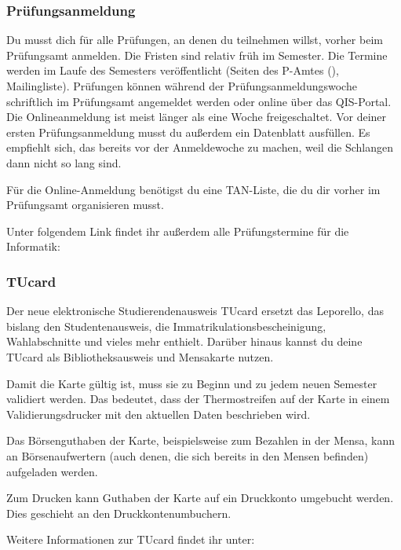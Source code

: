 \begin{multicols}{2}
\subsubsection{Prüfungsanmeldung}
	\label{todoanmeldung}

	Du musst dich für alle Prüfungen, an denen du teilnehmen willst, vorher beim Prüfungsamt anmelden. Die Fristen sind relativ früh im Semester. Die Termine werden im Laufe des Semesters veröffentlicht (Seiten des P-Amtes (), Mailingliste). Prüfungen können während der Prüfungsanmeldungswoche schriftlich im Prüfungsamt angemeldet werden oder online über das QIS-Portal. Die Onlineanmeldung ist meist länger als eine Woche freigeschaltet.
	Vor deiner ersten Prüfungsanmeldung musst du außerdem ein Datenblatt ausfüllen. Es empfiehlt sich, das bereits vor der Anmeldewoche zu machen, weil die Schlangen dann nicht so lang sind.

	Für die Online-Anmeldung benötigst du eine TAN-Liste, die du dir vorher im Prüfungsamt organisieren musst.

	Unter folgendem Link findet ihr außerdem alle Prüfungstermine für die Informatik: \\

\subsubsection{TUcard}
	\label{tucard}
	
	Der neue elektronische Studierendenausweis TUcard ersetzt das Leporello, das bislang den Studentenausweis, die Immatrikulationsbescheinigung, Wahlabschnitte und vieles mehr enthielt. Darüber hinaus kannst du deine TUcard als Bibliotheksausweis und Mensakarte nutzen.

	Damit die Karte gültig ist, muss sie zu Beginn und zu jedem neuen Semester validiert werden. Das bedeutet, dass der Thermostreifen auf der Karte in einem Validierungsdrucker mit den aktuellen Daten beschrieben wird.

	Das Börsenguthaben der Karte, beispielsweise zum Bezahlen in der Mensa, kann an Börsenaufwertern (auch denen, die sich bereits in den Mensen befinden) aufgeladen werden.

	Zum Drucken kann Guthaben der Karte auf ein Druckkonto umgebucht werden. Dies geschieht an den Druckkontenumbuchern.

	Weitere Informationen zur TUcard findet ihr unter: 


\end{multicols}
